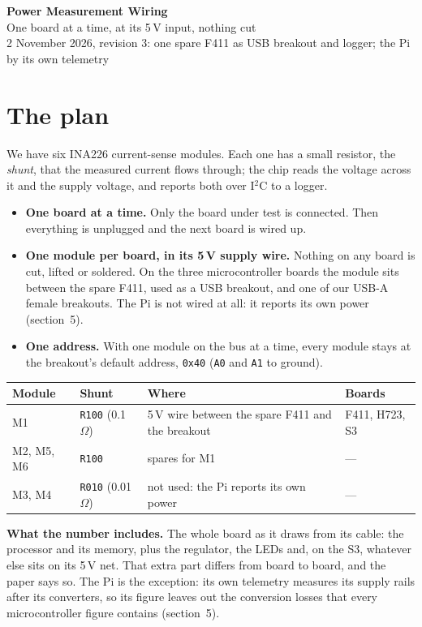 \documentclass[11pt]{article}
\newcommand{\code}[1]{\texttt{#1}}
\begin{document}
{\centering
{\LARGE\bfseries Power Measurement Wiring}\\[0.4em]
{\large One board at a time, at its 5\,V input, nothing cut}\\[0.3em]
{\small 2 November 2026, revision 3: one spare F411 as USB breakout and logger; the Pi by its own telemetry}\par}

\section{The plan}

We have six INA226 current-sense modules. Each one has a small resistor, the \emph{shunt},
that the measured current flows through; the chip reads the voltage across it and the supply
voltage, and reports both over I$^2$C to a logger.

\begin{itemize}
\item \textbf{One board at a time.} Only the board under test is connected. Then everything is
unplugged and the next board is wired up.
\item \textbf{One module per board, in its 5\,V supply wire.} Nothing on any board is cut,
lifted or soldered. On the three microcontroller boards the module sits between the spare
F411, used as a USB breakout, and one of our USB-A female breakouts. The Pi is not wired at
all: it reports its own power (section~5).
\item \textbf{One address.} With one module on the bus at a time, every module stays at the
breakout's default address, \code{0x40} (\code{A0} and \code{A1} to ground).
\end{itemize}

\begin{center}
\small
\begin{tabular}{@{}llll@{}}
\toprule
\textbf{Module} & \textbf{Shunt} & \textbf{Where} & \textbf{Boards}\\
\midrule
M1 & \code{R100} (0.1\,$\Omega$)  & 5\,V wire between the spare F411 and the breakout & F411, H723, S3\\
M2, M5, M6 & \code{R100} & spares for M1 & ---\\
M3, M4 & \code{R010} (0.01\,$\Omega$) & not used: the Pi reports its own power & ---\\
\bottomrule
\end{tabular}
\end{center}

\textbf{What the number includes.} The whole board as it draws from its cable: the processor
and its memory, plus the regulator, the LEDs and, on the S3, whatever else sits on its 5\,V
net. That extra part differs from board to board, and the paper says so. The Pi is the
exception: its own telemetry measures its supply rails after its converters, so its figure
leaves out the conversion losses that every microcontroller figure contains (section~5).
\end{document}

